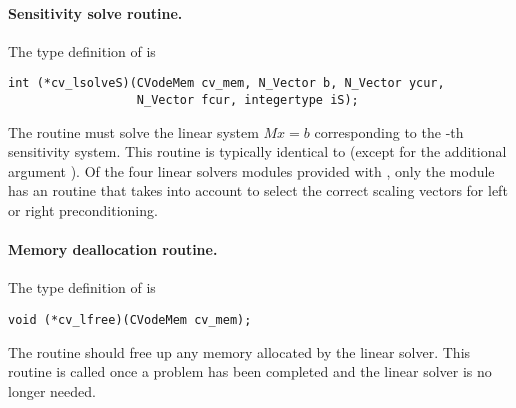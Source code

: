 \paragraph{Sensitivity solve routine.}
The type definition of  is
\begin{verbatim}
int (*cv_lsolveS)(CVodeMem cv_mem, N_Vector b, N_Vector ycur, 
                  N_Vector fcur, integertype iS);  
\end{verbatim}
The routine  must solve the linear system $M x = b$
corresponding to the -th sensitivity system.
This routine is typically identical to  (except for the
additional argument ). Of the four linear solvers modules provided with 
{\cvodes}, only the {\cvspgmr} module has an  routine that takes
into account  to select the correct scaling vectors for left or right
preconditioning.

\paragraph{Memory deallocation routine.}
The type definition of  is
\begin{verbatim}
void (*cv_lfree)(CVodeMem cv_mem);
\end{verbatim}
The routine  should free up any memory allocated by the linear
solver. This routine is called once a problem has been completed and the 
linear solver is no longer needed.
